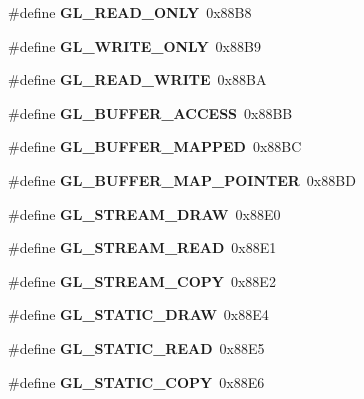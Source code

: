 \begin{DoxyCompactItemize}
\item 
\#define {\bfseries G\+L\+\_\+\+R\+E\+A\+D\+\_\+\+O\+N\+L\+Y}~0x88\+B8\label{_s_d_l__opengl_8h_afe26dad29b9cb2620e815e5fecea71f9}

\item 
\#define {\bfseries G\+L\+\_\+\+W\+R\+I\+T\+E\+\_\+\+O\+N\+L\+Y}~0x88\+B9\label{_s_d_l__opengl_8h_ab43997c5949dffce6674a7bb8a3059da}

\item 
\#define {\bfseries G\+L\+\_\+\+R\+E\+A\+D\+\_\+\+W\+R\+I\+T\+E}~0x88\+B\+A\label{_s_d_l__opengl_8h_aa5fd429fd2b79f5936c1421afb205dcd}

\item 
\#define {\bfseries G\+L\+\_\+\+B\+U\+F\+F\+E\+R\+\_\+\+A\+C\+C\+E\+S\+S}~0x88\+B\+B\label{_s_d_l__opengl_8h_a2f96540081e62b2137b049d19dffe23e}

\item 
\#define {\bfseries G\+L\+\_\+\+B\+U\+F\+F\+E\+R\+\_\+\+M\+A\+P\+P\+E\+D}~0x88\+B\+C\label{_s_d_l__opengl_8h_af551f91736f672b4da7cb21790040656}

\item 
\#define {\bfseries G\+L\+\_\+\+B\+U\+F\+F\+E\+R\+\_\+\+M\+A\+P\+\_\+\+P\+O\+I\+N\+T\+E\+R}~0x88\+B\+D\label{_s_d_l__opengl_8h_a627d65edccdcab9bae34bbec24d20f90}

\item 
\#define {\bfseries G\+L\+\_\+\+S\+T\+R\+E\+A\+M\+\_\+\+D\+R\+A\+W}~0x88\+E0\label{_s_d_l__opengl_8h_aaab0960233739efbd5d1ae2b2fb919cd}

\item 
\#define {\bfseries G\+L\+\_\+\+S\+T\+R\+E\+A\+M\+\_\+\+R\+E\+A\+D}~0x88\+E1\label{_s_d_l__opengl_8h_abd37e222235517858eb4fe1d8c09de40}

\item 
\#define {\bfseries G\+L\+\_\+\+S\+T\+R\+E\+A\+M\+\_\+\+C\+O\+P\+Y}~0x88\+E2\label{_s_d_l__opengl_8h_a6321e334ff05c0a003c26d5f953989e8}

\item 
\#define {\bfseries G\+L\+\_\+\+S\+T\+A\+T\+I\+C\+\_\+\+D\+R\+A\+W}~0x88\+E4\label{_s_d_l__opengl_8h_ab7dffdc215fbbe75b6ccacfecfc14648}

\item 
\#define {\bfseries G\+L\+\_\+\+S\+T\+A\+T\+I\+C\+\_\+\+R\+E\+A\+D}~0x88\+E5\label{_s_d_l__opengl_8h_a2cf81671d9eb48057082ae18523d5a4a}

\item 
\#define {\bfseries G\+L\+\_\+\+S\+T\+A\+T\+I\+C\+\_\+\+C\+O\+P\+Y}~0x88\+E6\label{_s_d_l__opengl_8h_a0009b9a26c78d29e6ed13cc056edc720}


\end{DoxyCompactItemize}
